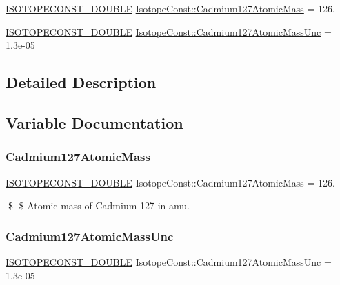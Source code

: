 \begin{DoxyCompactItemize}
\item 
\mbox{\hyperlink{group___isotope_const-_macros_ga8f45a7272ce02c0b4c65c44636ed719a}{I\+S\+O\+T\+O\+P\+E\+C\+O\+N\+S\+T\+\_\+\+D\+O\+U\+B\+LE}} \mbox{\hyperlink{group___isotope_const-_cadmium-_cd127_ga99be408c0db0796e69a07ccad55db267}{Isotope\+Const\+::\+Cadmium127\+Atomic\+Mass}} = 126.
\item 
\mbox{\hyperlink{group___isotope_const-_macros_ga8f45a7272ce02c0b4c65c44636ed719a}{I\+S\+O\+T\+O\+P\+E\+C\+O\+N\+S\+T\+\_\+\+D\+O\+U\+B\+LE}} \mbox{\hyperlink{group___isotope_const-_cadmium-_cd127_gad34fa010aba38354a03274b436612f87}{Isotope\+Const\+::\+Cadmium127\+Atomic\+Mass\+Unc}} = 1.\+3e-\/05
\end{DoxyCompactItemize}


\subsection{Detailed Description}


\subsection{Variable Documentation}
\mbox{\label{group___isotope_const-_cadmium-_cd127_ga99be408c0db0796e69a07ccad55db267}} 
\subsubsection{\texorpdfstring{Cadmium127\+Atomic\+Mass}{Cadmium127AtomicMass}}
{\footnotesize\ttfamily \mbox{\hyperlink{group___isotope_const-_macros_ga8f45a7272ce02c0b4c65c44636ed719a}{I\+S\+O\+T\+O\+P\+E\+C\+O\+N\+S\+T\+\_\+\+D\+O\+U\+B\+LE}} Isotope\+Const\+::\+Cadmium127\+Atomic\+Mass = 126.}

\$ \$ Atomic mass of Cadmium-\/127 in amu. \mbox{\label{group___isotope_const-_cadmium-_cd127_gad34fa010aba38354a03274b436612f87}} 
\subsubsection{\texorpdfstring{Cadmium127\+Atomic\+Mass\+Unc}{Cadmium127AtomicMassUnc}}
{\footnotesize\ttfamily \mbox{\hyperlink{group___isotope_const-_macros_ga8f45a7272ce02c0b4c65c44636ed719a}{I\+S\+O\+T\+O\+P\+E\+C\+O\+N\+S\+T\+\_\+\+D\+O\+U\+B\+LE}} Isotope\+Const\+::\+Cadmium127\+Atomic\+Mass\+Unc = 1.\+3e-\/05}

